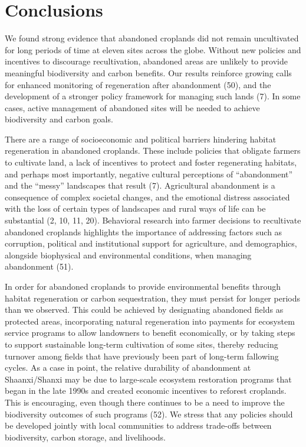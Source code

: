 \documentclass[9pt,twocolumn,twoside,lineno]{pnas-new}
\begin{document}
\hypertarget{conclusions}{%
\section*{Conclusions}\label{conclusions}}

We found strong evidence that abandoned croplands did not remain uncultivated for long periods of time at eleven sites across the globe.
Without new policies and incentives to discourage recultivation, abandoned areas are unlikely to provide meaningful biodiversity and carbon benefits.
Our results reinforce growing calls for enhanced monitoring of regeneration after abandonment (50), and the development of a stronger policy framework for managing such lands (7).
In some cases, active management of abandoned sites will be needed to achieve biodiversity and carbon goals.

There are a range of socioeconomic and political barriers hindering habitat regeneration in abandoned croplands.
These include policies that obligate farmers to cultivate land, a lack of incentives to protect and foster regenerating habitats, and perhaps most importantly, negative cultural perceptions of ``abandonment'' and the ``messy'' landscapes that result (7).
Agricultural abandonment is a consequence of complex societal changes, and the emotional distress associated with the loss of certain types of landscapes and rural ways of life can be substantial (2, 10, 11, 20).
Behavioral research into farmer decisions to recultivate abandoned croplands highlights the importance of addressing factors such as corruption, political and institutional support for agriculture, and demographics, alongside biophysical and environmental conditions, when managing abandonment (51).

In order for abandoned croplands to provide environmental benefits through habitat regeneration or carbon sequestration, they must persist for longer periods than we observed.
This could be achieved by designating abandoned fields as protected areas, incorporating natural regeneration into payments for ecosystem service programs to allow landowners to benefit economically, or by taking steps to support sustainable long-term cultivation of some sites, thereby reducing turnover among fields that have previously been part of long-term fallowing cycles.
As a case in point, the relative durability of abandonment at Shaanxi/Shanxi may be due to large-scale ecosystem restoration programs that began in the late 1990s and created economic incentives to reforest croplands.
This is encouraging, even though there continues to be a need to improve the biodiversity outcomes of such programs (52).
We stress that any policies should be developed jointly with local communities to address trade-offs between biodiversity, carbon storage, and livelihoods.
\end{document}
